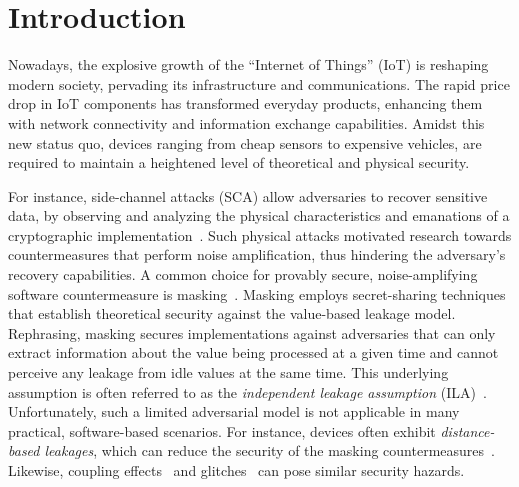 \section{Introduction}
Nowadays, the explosive growth of the ``Internet of Things'' (IoT) is reshaping modern society, pervading its infrastructure and communications.
The rapid price drop in IoT components has transformed everyday products, enhancing them with network connectivity and information exchange capabilities. Amidst this new status quo, devices ranging from cheap sensors to expensive vehicles, are required to maintain a heightened level of theoretical and physical security.

For instance, side-channel attacks (SCA) allow adversaries to recover sensitive data, by observing and analyzing the
physical characteristics and emanations of a cryptographic implementation~\cite{DBLP:conf/crypto/KocherJJ99}. Such physical attacks motivated research towards countermeasures that perform noise amplification, thus hindering the adversary's recovery capabilities. A common choice for provably secure, noise-amplifying software countermeasure is masking~\cite{DBLP:conf/crypto/ChariJRR99,DBLP:conf/crypto/IshaiSW03}. Masking employs secret-sharing techniques that establish theoretical security against the value-based leakage model. Rephrasing, masking secures implementations against adversaries that can only extract information about the value being processed at a given time and cannot perceive any leakage from idle values at the same time. This underlying assumption is often referred to as the \emph{independent leakage assumption} (ILA)~\cite{DBLP:conf/eurocrypt/RenauldSVKF11}. Unfortunately, such a limited adversarial model is not applicable in many practical, software-based scenarios. For instance, devices often exhibit \emph{distance-based leakages}, which can reduce the security of the masking countermeasures~\cite{DBLP:conf/cardis/BalaschGGRS14, DBLP:journals/iacr/GrootPPSB16}. Likewise, coupling effects~\cite{DBLP:conf/eurocrypt/RenauldSVKF11} and glitches~\cite{DBLP:conf/ches/MangardS06} can pose similar security hazards.

